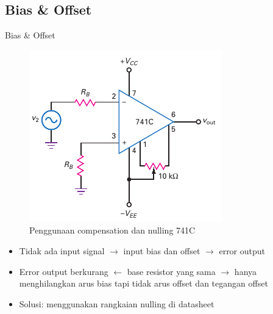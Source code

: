 \subsection{Bias \& Offset}
\begin{frame}{Bias \& Offset}
	\begin{multicols}{2}
		\begin{figure}
			\centering
			\includegraphics[width=0.8\linewidth]{gambar/fig-16.06}
			\caption{Penggunaan compensation dan nulling 741C}
			\label{fig-16.06}
		\end{figure}
		\columnbreak
		\begin{itemize}
			\item Tidak ada input signal $ \rightarrow $ input bias dan offset $ \rightarrow $ error output
			\item Error output berkurang $ \leftarrow $ base resistor yang sama $ \rightarrow $ hanya menghilangkan arus bias tapi tidak arus offset dan tegangan offset
			\item Solusi: menggunakan rangkaian nulling di datasheet
		\end{itemize}
		\vfill\null
	\end{multicols}
\end{frame}


